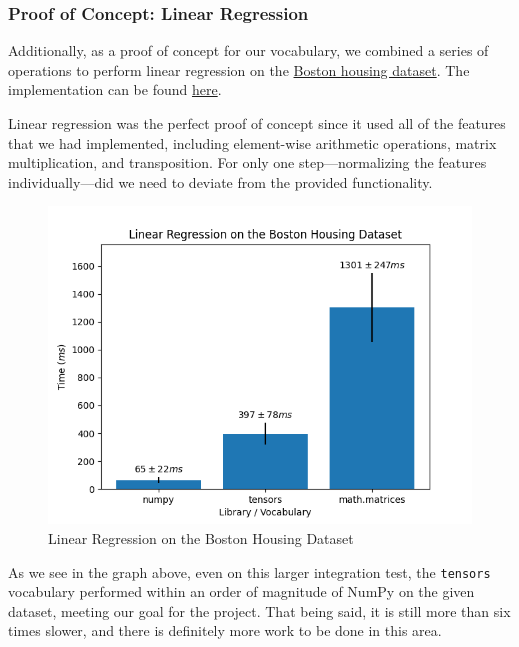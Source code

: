 \documentclass[
]{article}
\begin{document}
\hypertarget{proof-of-concept-linear-regression}{%
\subsubsection{Proof of Concept: Linear
Regression}\label{proof-of-concept-linear-regression}}

Additionally, as a proof of concept for our vocabulary, we combined a
series of operations to perform linear regression on the
\href{https://www.cs.toronto.edu/~delve/data/boston/bostonDetail.html}{Boston
housing dataset}. The implementation can be found
\href{https://github.com/factor/factor/blob/master/extra/tensors/demos/demos.factor}{here}.

Linear regression was the perfect proof of concept since it used all of
the features that we had implemented, including element-wise arithmetic
operations, matrix multiplication, and transposition. For only one
step---normalizing the features individually---did we need to deviate
from the provided functionality.

\begin{figure}
\centering
\includegraphics{linear_regression.png}
\caption{Linear Regression on the Boston Housing Dataset}
\end{figure}

As we see in the graph above, even on this larger integration test, the
\texttt{tensors} vocabulary performed within an order of magnitude of
NumPy on the given dataset, meeting our goal for the project. That being
said, it is still more than six times slower, and there is definitely
more work to be done in this area. 
\end{document}
